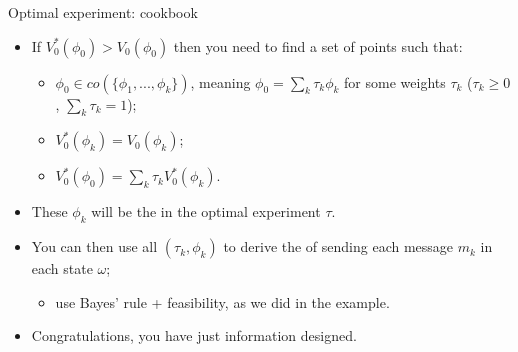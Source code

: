 \documentclass[english,10pt
,aspectratio=169
]{beamer}
\begin{document}
\begin{frame}{Optimal experiment: cookbook}
\begin{itemize}
	\item If $V_0^*(\phi_0) > V_0(\phi_0)$ then you need to find a set of points  such that:
	\begin{itemize}
		\item $\phi_0 \in co\left(\{\phi_1, ..., \phi_k\}\right)$, meaning $\phi_0 = \sum_k \tau_k \phi_k$ for some weights $\tau_k$ ($\tau_k \geq 0$, $\sum_k \tau_k = 1$);
		\item $V_0^*(\phi_k) = V_0(\phi_k)$;
		\item $V_0^*(\phi_0) = \sum_k \tau_k V_0^*(\phi_k)$.
	\end{itemize}
	\item These $\phi_k$ will be the  in the optimal experiment $\tau$.
	\item You can then use all $(\tau_k,\phi_k)$ to derive the  of sending each message $m_k$ in each state $\omega$;
	\begin{itemize}
		\item use Bayes' rule + feasibility, as we did in the example.
	\end{itemize}
	\item Congratulations, you have just information designed.
\end{itemize}
\end{frame}
\end{document}
